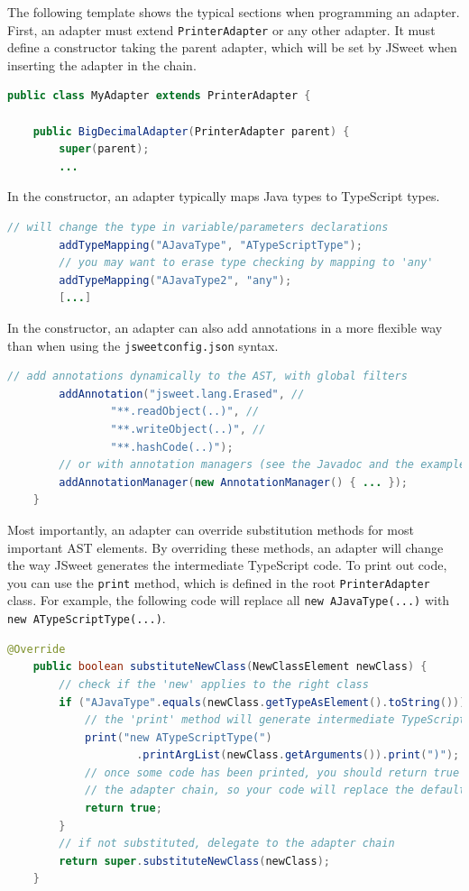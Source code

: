 \documentclass[a4paper]{report}
\begin{document}
The following template shows the typical sections when programming an adapter. First, an adapter must extend \texttt{PrinterAdapter} or any other adapter. It must define a constructor taking the parent adapter, which will be set by JSweet when inserting the adapter in the chain.

\begin{lstlisting}[language=Java]
public class MyAdapter extends PrinterAdapter {

	public BigDecimalAdapter(PrinterAdapter parent) {
		super(parent);
		...
\end{lstlisting}

In the constructor, an adapter typically maps Java types to TypeScript types.

\begin{lstlisting}[language=Java]
		// will change the type in variable/parameters declarations
		addTypeMapping("AJavaType", "ATypeScriptType");
		// you may want to erase type checking by mapping to 'any'
		addTypeMapping("AJavaType2", "any");
		[...]
\end{lstlisting}
		
In the constructor, an adapter can also add annotations in a more flexible way than when using the \texttt{jsweetconfig.json} syntax.
		
\begin{lstlisting}[language=Java]
		// add annotations dynamically to the AST, with global filters
		addAnnotation("jsweet.lang.Erased", //
				"**.readObject(..)", //
				"**.writeObject(..)", //
				"**.hashCode(..)");
		// or with annotation managers (see the Javadoc and the example below)		
		addAnnotationManager(new AnnotationManager() { ... });
	}
\end{lstlisting}

Most importantly, an adapter can override substitution methods for most important AST elements. By overriding these methods, an adapter will change the way JSweet generates the intermediate TypeScript code. To print out code, you can use the \texttt{print} method, which is defined in the root \texttt{PrinterAdapter} class. For example, the following code will replace all \texttt{new AJavaType(...)} with \texttt{new ATypeScriptType(...)}.

\begin{lstlisting}[language=Java]
	@Override
	public boolean substituteNewClass(NewClassElement newClass) {
		// check if the 'new' applies to the right class 
		if ("AJavaType".equals(newClass.getTypeAsElement().toString())) {
			// the 'print' method will generate intermediate TypeScript code
			print("new ATypeScriptType(")
					.printArgList(newClass.getArguments()).print(")");
			// once some code has been printed, you should return true to break 
			// the adapter chain, so your code will replace the default one
			return true;
		}
		// if not substituted, delegate to the adapter chain
		return super.substituteNewClass(newClass);
	}
\end{lstlisting}
\end{document}
